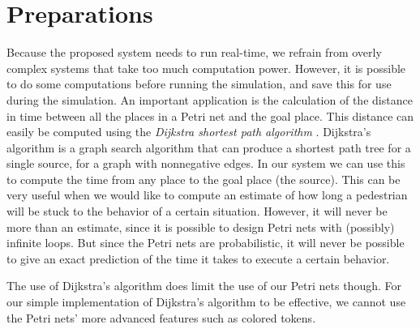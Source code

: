 \documentclass[11pt]{book}
\begin{document}
\section{Preparations}
Because the proposed system needs to run real-time, we refrain from overly complex systems that take too much computation power.
However, it is possible to do some computations before running the simulation, and save this for use during the simulation. An important application is the calculation of the distance in time between all the places in a Petri net and the goal place. This distance can easily be computed using the \emph{Dijkstra shortest path algorithm} \cite{dijkstra}. Dijkstra's algorithm is a graph search algorithm that can produce a shortest path tree for a single source, for a graph with nonnegative edges. In our system we can use this to compute the time from any place to the goal place (the source). This can be very useful when we would like to compute an estimate of how long a pedestrian will be stuck to the behavior of a certain situation. However, it will never be more than an estimate, since it is possible to design Petri nets with (possibly) infinite loops. But since the Petri nets are probabilistic, it will never be possible to give an exact prediction of the time it takes to execute a certain behavior.

The use of Dijkstra's algorithm does limit the use of our Petri nets though. For our simple implementation of Dijkstra's algorithm to be effective, we cannot use the Petri nets' more advanced features such as colored tokens.

\end{document}
